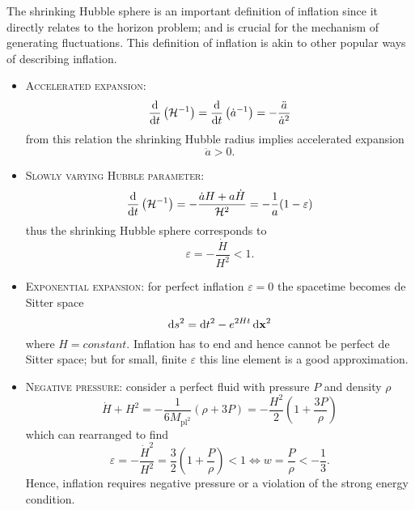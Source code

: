 The shrinking Hubble sphere is an important definition of inflation since it directly relates to the horizon problem; and is crucial for the mechanism of generating fluctuations.
This definition of inflation is akin to other popular ways of describing inflation.
%
\begin{itemize}
	\item \textsc{Accelerated expansion}:
	      \begin{equation}
		      \dv{t} \left(\mathcal{H}^{-1}\right)
		      = \dv{t} \left(\dot{a}^{-1}\right)
		      = -\frac{\ddot{a}}{\dot{a}^{2}}
	      \end{equation}
	      from this relation the shrinking Hubble radius implies accelerated expansion
	      \begin{equation}
		      \ddot{a}
		      > 0.
	      \end{equation}

	\item \textsc{Slowly varying Hubble parameter}:
	      \begin{equation}
		      \dv{t} \left(\mathcal{H}^{-1}\right)
		      = -\frac{\dot{a}H + a\dot{H}}{\mathcal{H}^{2}}
		      = -\frac{1}{a}(1-\varepsilon)
	      \end{equation}
	      thus the shrinking Hubble sphere corresponds to
	      \begin{equation}
		      \varepsilon
		      = -\frac{\dot{H}}{H^{2}}
		      < 1.
	      \end{equation}

	\item \textsc{Exponential expansion}:
	      for perfect inflation \(\varepsilon=0\) the spacetime becomes de Sitter space
	      \begin{equation}
		      \dd{s^{2}}
		      = \dd{t^{2}} - e^{2Ht} \dd{\vb{x}^{2}}
	      \end{equation}
	      where \(H=constant\).
	      Inflation has to end and hence cannot be perfect de Sitter space; but for small, finite \({\varepsilon}\) this line element is a good approximation.

	\item \textsc{Negative pressure}:
	      consider a perfect fluid with pressure \(P\) and density \({\rho}\)
	      \begin{equation}\label{eq:negative_pressure}
		      \dot{H} + H^{2}
		      = -\frac{1}{6M_{\text{pl}^{2}}}(\rho+3P)
		      = -\frac{H^{2}}{2} \left(1 + \frac{3P}{\rho}\right)
	      \end{equation}
	      which can rearranged to find
	      \begin{equation}
		      \varepsilon = -\frac{\dot{H}^{2}}{H^{2}} = \frac{3}{2} \left(1 + \frac{P}{\rho}\right) < 1 \Leftrightarrow w = \frac{P}{\rho} < -\frac{1}{3}.
	      \end{equation}
	      Hence, inflation requires negative pressure or a violation of the strong energy condition.


\end{itemize}
